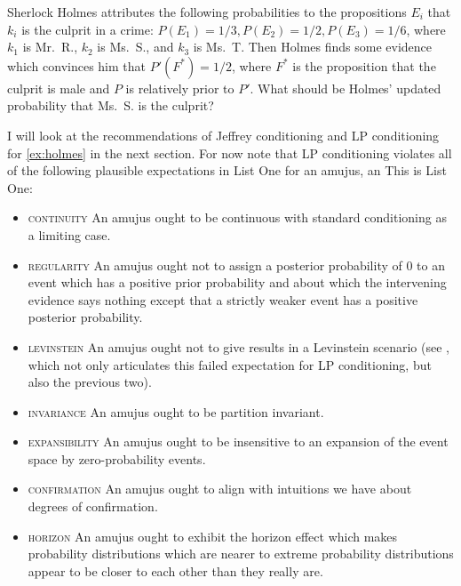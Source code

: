 \documentclass[11pt]{article}
\begin{document}
\begin{quotex}
  \label{ex:holmes} Sherlock Holmes
  attributes the following probabilities to the propositions $E_{i}$
  that $k_{i}$ is the culprit in a crime:
  $P(E_{1})=1/3,P(E_{2})=1/2,P(E_{3})=1/6$, where $k_{1}$ is Mr.\ R.,
  $k_{2}$ is Ms.\ S., and $k_{3}$ is Ms.\ T. Then Holmes finds some
  evidence which convinces him that $P'(F^{*})=1/2$, where $F^{*}$ is
  the proposition that the culprit is male and $P$ is relatively prior
  to $P'$. What should be Holmes' updated probability that Ms.\ S. is
  the culprit?
\end{quotex}

I will look at the recommendations of Jeffrey conditioning and LP
conditioning for {\xample} \ref{ex:holmes} in the next section. For
now note that LP conditioning violates all of the following plausible
expectations in List One\label{page:listone} for an amujus, an
 This is List One:

\begin{itemize}
\item \textsc{continuity} An amujus ought to be continuous with
  standard conditioning as a limiting case.
\item \textsc{regularity} An amujus ought not to assign a posterior
  probability of $0$ to an event which has a positive prior
  probability and about which the intervening evidence says nothing
  except that a strictly weaker event has a positive posterior
  probability.
\item \textsc{levinstein} An amujus ought not to give  results in a Levinstein scenario (see
  , which not only articulates this failed
  expectation for LP conditioning, but also the previous two).
\item \textsc{invariance} An amujus ought to be partition invariant.
\item \textsc{expansibility} An amujus ought to be insensitive to an
  expansion of the event space by zero-probability events.
\item \textsc{confirmation} An amujus ought to align with intuitions
  we have about degrees of confirmation.
\item \textsc{horizon} An amujus ought to exhibit the horizon effect
  which makes probability distributions which are nearer to extreme
  probability distributions appear to be closer to each other than
  they really are.
\end{itemize}
\end{document}
